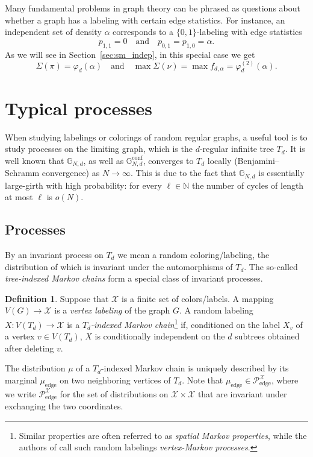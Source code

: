 \documentclass[12pt]{amsart}
\theoremstyle{definition}
\newtheorem{definition}[theorem]{Definition}
\newcommand\Nb{\mathbb{N}}
\newcommand\Gb{\mathbb{G}}
\newcommand\Gbconf{\mathbb{G}^{\textrm{conf}}}
\newcommand\Pcedge{\mathcal{P}_\mathrm{edge}}
\newcommand\Xc{\mathcal{X}}
\newcommand\al{\alpha}
\newcommand\muedge{\mu_\mathrm{edge}}
\begin{document}
Many fundamental problems in graph theory can be phrased as questions about whether a graph has a labeling with certain edge statistics. For instance, an independent set of density $\al$ corresponds to a $\{0,1\}$-labeling with edge statistics 
%
\[ p_{1,1}=0 \quad \text{and} \quad 
p_{0,1}=p_{1,0} = \al .\]
%
As we will see in Section~\ref{sec:sm_indep}, in this special case we get 
%
\[ \Sigma(\pi)=\varphi_d(\al)
\quad \text{and} \quad 
\max \Sigma(\nu) 
= \max f_{d,\al} 
=\varphi_d^{(2)}(\al) .\]
%

\section{Typical processes} \label{sec:typical}

When studying labelings or colorings of random regular graphs, a useful tool is to study processes on the limiting graph, which is the $d$-regular infinite tree $T_d$. It is well known that $\Gb_{N,d}$, as well as $\Gbconf_{N,d}$, converges to $T_d$ locally (Benjamini--Schramm convergence) as $N \to \infty$. This is due to the fact that $\Gb_{N,d}$ is essentially large-girth with high probability: for every $\ell \in \Nb$ the number of cycles of length at most $\ell$ is $o(N)$. 

\subsection{Processes}
%
By an invariant process on $T_d$ we mean a random coloring/labeling, the distribution of which is invariant under the automorphisms of $T_d$. The so-called \emph{tree-indexed Markov chains} form a special class of invariant processes. 
%
\begin{definition} \label{def:Markov}
Suppose that $\Xc$ is a finite set of colors/labels. A mapping $V(G) \to \Xc$ is a \emph{vertex labeling} of the graph $G$. A random labeling $X \colon V(T_d) \to \Xc$ is a \emph{$T_d$-indexed Markov chain}\footnote{Similar properties are often referred to as \emph{spatial Markov properties}, while the authors of \cite{backhausz2022typicality} call such random labelings \emph{vertex-Markov processes}.} if, conditioned on the label $X_v$ of a vertex $v \in V(T_d)$, $X$ is conditionally independent on the $d$ subtrees obtained after deleting $v$. 
\end{definition}
%
The distribution $\mu$ of a $T_d$-indexed Markov chain is uniquely described by its marginal $\muedge$ on two neighboring vertices of $T_d$. Note that $\muedge \in \Pcedge^\Xc$, where we write $\Pcedge^\Xc$ for the set of distributions on $\Xc \times \Xc$ that are invariant under exchanging the two coordinates.
\end{document}
